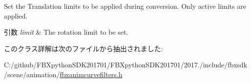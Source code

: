 Set the Translation limits to be applied during conversion. Only active limits are applied. 
\begin{DoxyParams}{引数}
{\em limit} & The rotation limit to be set. \\
\hline
\end{DoxyParams}


このクラス詳解は次のファイルから抽出されました\+:\begin{DoxyCompactItemize}
\item 
C\+:/github/\+F\+B\+Xpython\+S\+D\+K201701/\+F\+B\+Xpython\+S\+D\+K201701/2017./include/fbxsdk/scene/animation/\hyperlink{fbxanimcurvefilters_8h}{fbxanimcurvefilters.\+h}\end{DoxyCompactItemize}

